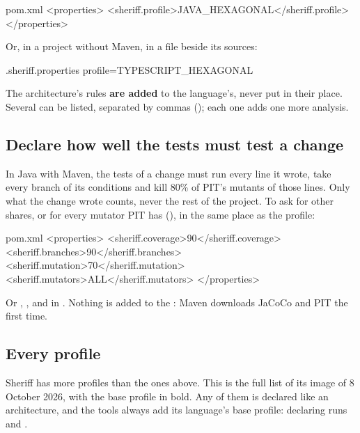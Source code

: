 \documentclass[11pt,a4paper]{article}
\begin{document}
\begin{command}{pom.xml}
<properties>
  <sheriff.profile>JAVA_HEXAGONAL</sheriff.profile>
</properties>
\end{command}

Or, in a project without Maven, in a  file beside its
sources:

\begin{command}{.sheriff.properties}
profile=TYPESCRIPT_HEXAGONAL
\end{command}

The architecture's rules \textbf{are added} to the language's, never put in
their place. Several can be listed, separated by commas
(); each one adds one more analysis.

\subsection{Declare how well the tests must test a change}\label{sec:coverage}

In Java with Maven, the tests of a change must run every line it wrote, take
every branch of its conditions and kill 80\% of PIT's mutants of those lines.
Only what the change wrote counts, never the rest of the project. To ask for
other shares, or for every mutator PIT has (), in the same place as
the profile:

\begin{command}{pom.xml}
<properties>
  <sheriff.coverage>90</sheriff.coverage>
  <sheriff.branches>90</sheriff.branches>
  <sheriff.mutation>70</sheriff.mutation>
  <sheriff.mutators>ALL</sheriff.mutators>
</properties>
\end{command}

Or , ,  and  in
.
Nothing is added to the : Maven downloads JaCoCo and PIT the first
time.

\subsection{Every profile}

Sheriff has more profiles than the ones above. This is the full list of its
image of 8 October 2026, with the base profile in bold. Any of them is declared
like an architecture, and the tools always add its language's base profile:
declaring  runs  and
.
\end{document}
